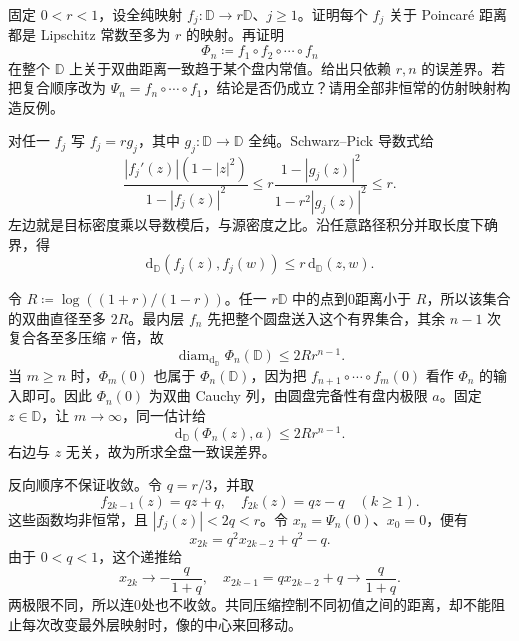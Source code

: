 \begin{exercise}[共同像界与复合顺序]\label{b3:ex:13-4}
固定 \(0<r<1\)，设全纯映射 \(f_j:\mathbb D\rightarrow r\mathbb D\)、\(j\ge1\)。证明每个 \(f_j\) 关于 Poincaré 距离都是 Lipschitz 常数至多为 \(r\) 的映射。再证明
\[
 \Phi_n\coloneqq f_1\circ f_2\circ\cdots\circ f_n
\]
在整个 \(\mathbb D\) 上关于双曲距离一致趋于某个盘内常值。给出只依赖 \(r,n\) 的误差界。若把复合顺序改为 \(\Psi_n=f_n\circ\cdots\circ f_1\)，结论是否仍成立？请用全部非恒常的仿射映射构造反例。
\end{exercise}
\begin{solution}
对任一 \(f_j\) 写 \(f_j=rg_j\)，其中 \(g_j:\mathbb D\rightarrow\mathbb D\) 全纯。Schwarz--Pick 导数式给
\[
 \frac{|f_j'(z)|(1-|z|^2)}{1-|f_j(z)|^2}
 \le r\frac{1-|g_j(z)|^2}{1-r^2|g_j(z)|^2}\le r.
\]
左边就是目标密度乘以导数模后，与源密度之比。沿任意路径积分并取长度下确界，得
\[
 \mathrm d_{\mathbb D}(f_j(z),f_j(w))\le r\,\mathrm d_{\mathbb D}(z,w).
\]

令 \(R\coloneqq\log((1+r)/(1-r))\)。任一 \(r\mathbb D\) 中的点到0距离小于 \(R\)，所以该集合的双曲直径至多 \(2R\)。最内层 \(f_n\) 先把整个圆盘送入这个有界集合，其余 \(n-1\) 次复合各至多压缩 \(r\) 倍，故
\[
 \operatorname{diam}_{\mathrm d_{\mathbb D}}\Phi_n(\mathbb D)
 \le2Rr^{n-1}.
\]
当 \(m\ge n\) 时，\(\Phi_m(0)\) 也属于 \(\Phi_n(\mathbb D)\)，因为把 \(f_{n+1}\circ\cdots\circ f_m(0)\) 看作 \(\Phi_n\) 的输入即可。因此 \(\Phi_n(0)\) 为双曲 Cauchy 列，由圆盘完备性有盘内极限 \(a\)。固定 \(z\in\mathbb D\)，让 \(m\rightarrow\infty\)，同一估计给
\[
 \mathrm d_{\mathbb D}(\Phi_n(z),a)\le2Rr^{n-1}.
\]
右边与 \(z\) 无关，故为所求全盘一致误差界。

反向顺序不保证收敛。令 \(q=r/3\)，并取
\[
 f_{2k-1}(z)=qz+q,\quad f_{2k}(z)=qz-q\quad(k\ge1).
\]
这些函数均非恒常，且 \(|f_j(z)|<2q<r\)。令 \(x_n=\Psi_n(0)\)、\(x_0=0\)，便有
\[
 x_{2k}=q^2x_{2k-2}+q^2-q.
\]
由于 \(0<q<1\)，这个递推给
\[
 x_{2k}\longrightarrow-\frac q{1+q},\quad
 x_{2k-1}=qx_{2k-2}+q\longrightarrow\frac q{1+q}.
\]
两极限不同，所以连0处也不收敛。共同压缩控制不同初值之间的距离，却不能阻止每次改变最外层映射时，像的中心来回移动。
\end{solution}

